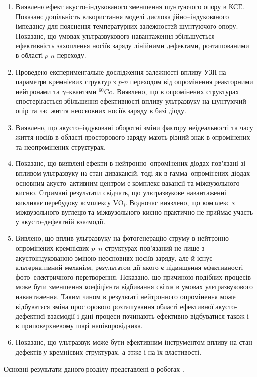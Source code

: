 \begin{enumerate}
     \item Виявлено ефект акусто--індукованого зменшення шунтуючого опору в КСЕ.
      Показано доцільність використання моделі дислокаційно--індукованого імпедансу для пояснення температурних залежностей шунтуючого опору.
      Показано, що умовах ультразвукового навантаження збільшується ефективність захоплення носіїв заряду лінійними дефектами,
      розташованими в області $p$-$n$ переходу.

     \item Проведено експериментальне дослідження залежності впливу УЗН на параметри кремнієвих структур з $p$-$n$ переходом від
      опромінення реакторними нейтронами та $\gamma$--квантами $^{60}$Co.
      Виявлено, що в опромінених структурах спостерігається збільшення ефективності впливу ультразвуку
      на шунтуючий опір та час життя неосновних носіїв заряду в базі діоду.

     \item Виявлено, що акусто--індуковані оборотні зміни фактору неідеальності та часу життя носіїв в області просторового заряду
     мають різний знак в опромінених та неопромінених структурах.

     \item Показано, що виявлені ефекти в нейтронно--опромінених діодах пов'язані зі впливом ультразвуку на стан дивакансій,
     тоді як в гамма--опромінених діодах основним акусто--активним центром є комплекс вакансії та міжвузольного кисню.
     Отримані результати свідчать, що ультразвукове навантаженні викликає перебудову комплексу VO$_i$.
     Водночас виявлено, що комплекс з міжвузольного вуглецю та міжвузольного кисню практично не приймає участь у
     акусто--дефектній взаємодії.

     \item Вивлено, що вплив ультразвуку на фотогенерацію струму в нейтронно--опромінених
     кремнієвих $p$--$n$ структурах пов'язаний не лише з
     акустоіндукованою зміною неосновних носіїв заряду, але й існує альтернативний механізм, результатом дії
     якого є підвищення ефективності фото--електричного перетворення.
     Показано, що причиною подібних процесів може бути зменшення коефіцієнта відбивання світла в умовах ультразвукового навантаження.
     Таким чином в результаті нейтронного опромінення може відбуватися зміна просторового розташування області ефективної акусто-дефектної
     взаємодії і дані процеси починають ефективно відбуватися також і в
     приповерхневому шарі напівпровідника.

    \item Показано, що ультразвук може бути ефективним інструментом впливу на стан дефектів у кремнієвих структурах, а отже і на їх властивості.
  \end{enumerate}	

Основні результати даного розділу представлені в роботах
\cite{Olikh:Visn2003,Olikh:MRS2007,Olikh:SEMT2007,Olikh:FTP2009,Olikh:UPJ2010,Olikh:FTP2011,Olikh2018JAP,
1SEMST,2005IUS,ICU2007SC,2007MRS,3UNCPS,6Drog,4UNCPS,4Kremen,6SEMST,2017MEICS}.
